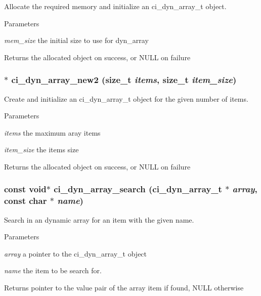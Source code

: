 Allocate the required memory and initialize an ci\_\-dyn\_\-array\_\-t object. 
\begin{DoxyParams}{Parameters}
\item[{\em mem\_\-size}]the initial size to use for dyn\_\-array \end{DoxyParams}
\begin{DoxyReturn}{Returns}
the allocated object on success, or NULL on failure 
\end{DoxyReturn}
\hypertarget{group__DYNAMIC__ARRAYS_ga94c47c0e9552dd8f45b47b91e09de2b9}{
\subsubsection[{ci\_\-dyn\_\-array\_\-new2}]{$\ast$ ci\_\-dyn\_\-array\_\-new2 (size\_\-t {\em items}, \/  size\_\-t {\em item\_\-size})}}
\label{group__DYNAMIC__ARRAYS_ga94c47c0e9552dd8f45b47b91e09de2b9}


Create and initialize an ci\_\-dyn\_\-array\_\-t object for the given number of items. 
\begin{DoxyParams}{Parameters}
\item[{\em items}]the maximum aray items \item[{\em item\_\-size}]the items size \end{DoxyParams}
\begin{DoxyReturn}{Returns}
the allocated object on success, or NULL on failure 
\end{DoxyReturn}
\hypertarget{group__DYNAMIC__ARRAYS_gaa2a9f363adbac9d2fcf535fa913a6177}{
\subsubsection[{ci\_\-dyn\_\-array\_\-search}]{\setlength{\rightskip}{0pt plus 5cm}const void$\ast$ ci\_\-dyn\_\-array\_\-search ({\bf ci\_\-dyn\_\-array\_\-t} $\ast$ {\em array}, \/  const char $\ast$ {\em name})}}
\label{group__DYNAMIC__ARRAYS_gaa2a9f363adbac9d2fcf535fa913a6177}


Search in an dynamic array for an item with the given name. 
\begin{DoxyParams}{Parameters}
\item[{\em array}]a pointer to the ci\_\-dyn\_\-array\_\-t object \item[{\em name}]the item to be search for. \end{DoxyParams}
\begin{DoxyReturn}{Returns}
pointer to the value pair of the array item if found, NULL otherwise 
\end{DoxyReturn}
